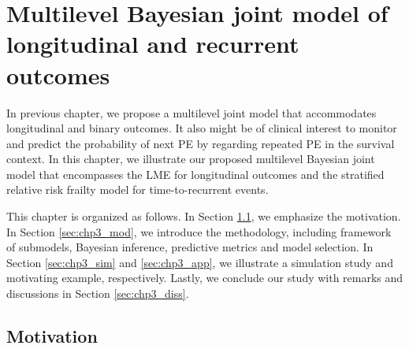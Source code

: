 \chapter{Multilevel Bayesian joint model of longitudinal and recurrent outcomes}\label{chp3}

In previous chapter, we propose a multilevel joint model that accommodates longitudinal and binary outcomes. It also might be of clinical interest to monitor and predict the probability of next PE by regarding repeated PE in the survival context. In this chapter, we illustrate our proposed multilevel Bayesian joint model that encompasses the LME for longitudinal outcomes and the stratified relative risk frailty model for time-to-recurrent events.  

This chapter is organized as follows. In Section \ref{sec:chp3_mov}, we emphasize the motivation. In Section \ref{sec:chp3_mod}, we introduce the methodology, including framework of submodels, Bayesian inference, predictive metrics and model selection. In Section \ref{sec:chp3_sim} and \ref{sec:chp3_app}, we illustrate a simulation study and motivating example, respectively. Lastly, we conclude our study with remarks and discussions in Section \ref{sec:chp3_diss}. 

\section{Motivation} \label{sec:chp3_mov}

